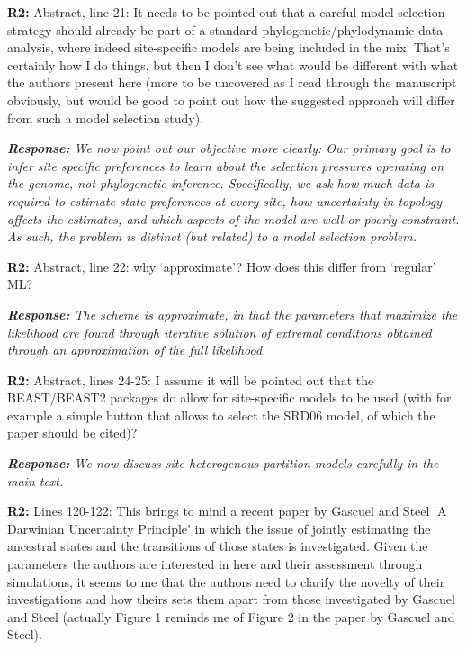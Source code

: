 \documentclass[aps,rmp,onecolumn]{revtex4-1}
\newcommand{\refb}[1]{\textbf{R2:} #1}
\newcommand{\response}[1]{{\it {\color{response}\textbf{Response:} #1}}}
\begin{document}
\refb{Abstract, line 21: It needs to be pointed out that a careful model selection strategy should already be part of a standard phylogenetic/phylodynamic data analysis, where indeed site-specific models are being included in the mix. That’s certainly how I do things, but then I don’t see what would be different with what the authors present here (more to be uncovered as I read through the manuscript obviously, but would be good to point out how the suggested approach will differ from such a model selection study).}

\response{
We now point out our objective more clearly: Our primary goal is to infer site specific preferences to learn about the selection pressures operating on the genome, not phylogenetic inference.
Specifically, we ask how much data is required to estimate state preferences at every site, how uncertainty in topology affects the estimates, and which aspects of the model are well or poorly constraint.
As such, the problem is distinct (but related) to a model selection problem.
}

\refb{Abstract, line 22: why ‘approximate’? How does this differ from ‘regular’ ML?}

\response{The scheme is approximate, in that the parameters that maximize the likelihood are found through iterative solution of extremal conditions obtained through an approximation of the full likelihood. }

\refb{Abstract, lines 24-25: I assume it will be pointed out that the BEAST/BEAST2 packages do allow for site-specific models to be used (with for example a simple button that allows to select the SRD06 model, of which the paper should be cited)?}

\response{We now discuss site-heterogenous partition models carefully in the main text.}


\refb{Lines 120-122: This brings to mind a recent paper by Gascuel and Steel ‘A Darwinian Uncertainty Principle’ in which the issue of jointly estimating the ancestral states and the transitions of those states is investigated. Given the parameters the authors are interested in here and their assessment through simulations, it seems to me that the authors need to clarify the novelty of their investigations and how theirs sets them apart from those investigated by Gascuel and Steel (actually Figure 1 reminds me of Figure 2 in the paper by Gascuel and Steel).}
\end{document}
